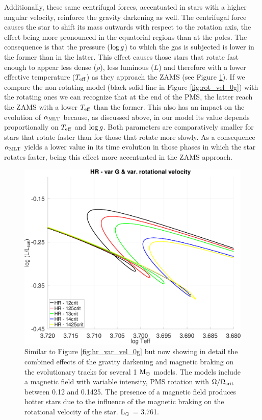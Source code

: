 \documentclass[fleqn,usenatbib]{mnras}
\begin{document}
\begin{ceqn}
Additionally, these same centrifugal forces, accentuated in stars with a higher angular velocity, reinforce the gravity darkening \citep[see e.g. ][]{Gossage2021,Paxton2019,Eggenberger2012} as well. The centrifugal force causes the star to shift its mass outwards with respect to the rotation axis, the effect being more pronounced in the equatorial regions than at the poles. The consequence is that the pressure ($\mathrm{log} \, g$) to which the gas is subjected is lower in the former than in the latter. This effect causes those stars that rotate fast enough to appear less dense ($\rho$), less luminous ($L$) and therefore with a lower effective temperature ($T_{\mathrm{eff}}$) as they approach the ZAMS (see Figure \ref{fig:hr_var_vel_var_g_z13}). If we compare the non-rotating model (black solid line in Figure \ref{fig:rot_vel_0g}) with the rotating ones we can recognize that at the end of the PMS, the latter reach the ZAMS with a lower $T_{\mathrm{eff}}$ than the former. This also has an impact on the evolution of $\alpha_{\mathrm{MLT}}$ because, as discussed above, in our model its value depends proportionally on $T_{\mathrm{eff}}$ and $\mathrm{log} \, g$. Both parameters are comparatively smaller for stars that rotate faster than for those that rotate more slowly. As a consequence $\alpha_{\mathrm{MLT}}$ yields a lower value in its time evolution in those phases in which the star rotates faster, being this effect more accentuated in the ZAMS approach.\par

\begin{figure}
	\includegraphics[clip,width=\columnwidth]{figures/paper2/hr_var_vel_var_g_z13.pdf}
    \caption{Similar to Figure \ref{fig:hr_var_vel_0g} but now showing in detail the combined effects of the gravity darkening and magnetic braking on the evolutionary tracks for several 1 $\mathrm{M}_\odot$ models. The models include a magnetic field with variable intensity, PMS rotation with $\Omega / \Omega_{\mathrm{crit}}$ between 0.12 and 0.1425. The presence of a magnetic field produces hotter stars due to the influence of the magnetic braking on the rotational velocity of the star. $\mathrm{L}_\odot$ = 3.761.}
    \label{fig:hr_var_vel_var_g_z13}
\end{figure}


\end{ceqn}
\end{document}
